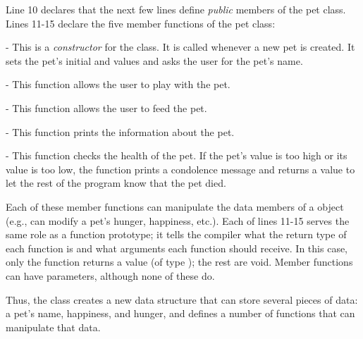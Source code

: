 Line 10 declares that the next few lines define \emph{public} members of the pet class.
Lines 11-15 declare the five member functions of the pet class:
\begin{tight_enumerate}
\item {} - This is a \emph{constructor} for the  class.  It is called whenever a new pet is created.  It sets the pet's initial  and  values and asks the user for the pet's name.
\item {} - This function allows the user to play with the pet.
\item {} - This function allows the user to feed the pet.
\item {} - This function prints the information about the pet.
\item {} - This function checks the health of the pet.  If the pet's  value is too high or its  value is too low, the function prints a condolence message and returns a value to let the rest of the program know that the pet died.
\end{tight_enumerate}

Each of these member functions can manipulate the data members of a  object (e.g., can modify a pet's hunger, happiness, etc.).  Each of lines 11-15 serves the same role as a function prototype; it tells the compiler what the return type of each function is and what arguments each function should receive.  In this case, only the  function returns a value (of type ); the rest are void.  Member functions can have parameters, although none of these do.  

Thus, the  class creates a new data structure that can store several pieces of data: a pet's name, happiness, and hunger, and defines a number of functions that can manipulate that data.  

